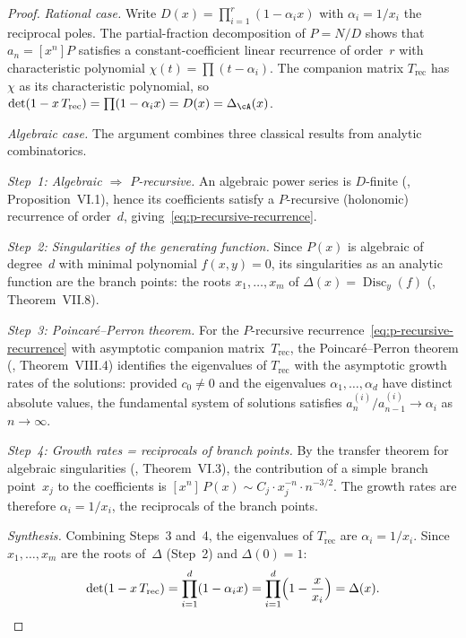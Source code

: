 \begin{proof}
\emph{Rational case.}
Write $D(x) = \prod_{i=1}^{r}(1 - \alpha_i x)$ with
$\alpha_i = 1/x_i$ the reciprocal poles.
The partial-fraction decomposition of
$P = N/D$ shows that $a_n = [x^n]P$ satisfies a
constant-coefficient linear recurrence of order~$r$
with characteristic polynomial
$\chi(t) = \prod(t - \alpha_i)$.
The companion matrix $T_{\mathrm{rec}}$ has $\chi$ as
its characteristic polynomial, so
$\det(1 - x\,T_{\mathrm{rec}}) = \prod(1 - \alpha_i x)
= D(x) = \Delta_{\cA}(x)$.

\emph{Algebraic case.}
The argument combines three classical results from analytic
combinatorics.

\emph{Step~1: Algebraic $\Rightarrow$ $P$-recursive.}
An algebraic power series is $D$-finite
(\cite{FlajoletSedgewick}, Proposition~VI.1), hence its
coefficients satisfy a $P$-recursive (holonomic) recurrence
of order~$d$, giving~\eqref{eq:p-recursive-recurrence}.

\emph{Step~2: Singularities of the generating function.}
Since $P(x)$ is algebraic of degree~$d$ with minimal polynomial
$f(x,y) = 0$, its singularities as an analytic function are
the branch points: the roots $x_1, \ldots, x_m$ of
$\Delta(x) = \operatorname{Disc}_y(f)$
(\cite{FlajoletSedgewick}, Theorem~VII.8).

\emph{Step~3: Poincar\'e--Perron theorem.}
For the $P$-recursive recurrence~\eqref{eq:p-recursive-recurrence}
with asymptotic companion matrix~$T_{\mathrm{rec}}$, the
Poincar\'e--Perron theorem
(\cite{FlajoletSedgewick}, Theorem~VIII.4)
identifies the eigenvalues of $T_{\mathrm{rec}}$ with the
asymptotic growth rates of the solutions: provided
$c_0 \neq 0$ and the eigenvalues $\alpha_1, \ldots, \alpha_d$
have distinct absolute values, the fundamental system of
solutions satisfies
$a_n^{(i)}/a_{n-1}^{(i)} \to \alpha_i$ as $n \to \infty$.

\emph{Step~4: Growth rates = reciprocals of branch points.}
By the transfer theorem for algebraic singularities
(\cite{FlajoletSedgewick}, Theorem~VI.3), the contribution
of a simple branch point~$x_j$ to the coefficients is
$[x^n]\, P(x) \sim C_j \cdot x_j^{-n} \cdot n^{-3/2}$.
The growth rates are therefore $\alpha_i = 1/x_i$, the
reciprocals of the branch points.

\emph{Synthesis.}
Combining Steps~3 and~4, the eigenvalues of $T_{\mathrm{rec}}$
are $\alpha_i = 1/x_i$.  Since $x_1, \ldots, x_m$ are the
roots of~$\Delta$ (Step~2) and $\Delta(0) = 1$:
\[
\det(1 - x\, T_{\mathrm{rec}})
= \prod_{i=1}^d (1 - \alpha_i x)
= \prod_{i=1}^d \Bigl(1 - \frac{x}{x_i}\Bigr)
= \Delta(x). \qedhere
\]
\end{proof}

